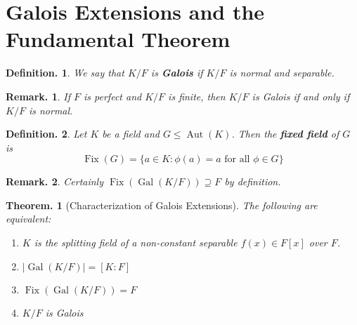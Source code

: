 \documentclass[11pt, a4paper]{memoir}
\newcommand{\mbf}[1]{{\boldmath\bfseries #1}}
\theoremstyle{change}
\newtheorem{theorem}{Theorem.}[section]
\theoremstyle{plain}
\theoremstyle{nonumberplain}
\newtheorem{definition}{Definition.}
\newtheorem{remark}{Remark.}
\DeclareMathOperator{\Aut}{Aut}
\DeclareMathOperator{\Fix}{Fix}
\DeclareMathOperator{\Gal}{Gal}
\numberwithin{equation}{section}
\begin{document}
\section{Galois Extensions and the Fundamental Theorem}
\begin{definition}
    We say that $K/F$ is \mbf{Galois} if $K/F$ is normal and separable.
\end{definition}
\begin{remark}
    If $F$ is perfect and $K/F$ is finite, then $K/F$ is Galois if and only if $K/F$ is normal.
\end{remark}
\begin{definition}
    Let $K$ be a field and $G\leq\Aut(K)$.
    Then the \mbf{fixed field} of $G$ is
    \begin{equation*}
        \Fix(G)=\bigl\{a\in K:\phi(a)=a\text{ for all }\phi\in G\bigr\}
    \end{equation*}
\end{definition}
\begin{remark}
    Certainly $\Fix(\Gal(K/F))\supseteq F$ by definition.
\end{remark}
\begin{theorem}[Characterization of Galois Extensions]\label{thm:char-gal}
    The following are equivalent:
    \begin{enumerate}[nl]
        \item $K$ is the splitting field of a non-constant separable $f(x)\in F[x]$ over $F$.
        \item $|\Gal(K/F)|=[K:F]$
        \item $\Fix(\Gal(K/F))=F$
        \item $K/F$ is Galois
    \end{enumerate}
\end{theorem}
\end{document}
